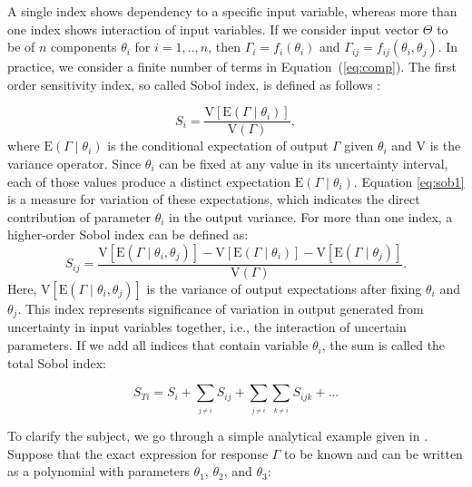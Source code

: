 A single index shows dependency to a specific input variable, whereas more than
one index shows interaction of input variables. If we consider input vector
$\Theta$ to be of $n$ components $\theta_{i}$ for $i=1,..,n$, then
$\Gamma_{i}=f_{i}(\theta_{i})$ and $\Gamma_{ij}=f_{ij}(\theta_{i},\theta_{j})$.
In practice, we consider a finite number of terms in Equation~(\ref{eq:comp}).
 The first order sensitivity index, so called Sobol index, is defined as follows
\cite{saltelli2007global}:

\begin{equation}
S_{i}=\frac{\mbox{V}[\mbox{E}(\Gamma\mid\theta_{i})]}{\mbox{V}(\Gamma)},
\label{eq:sob1}\end{equation} where $\mbox{E}(\Gamma\mid\theta_{i})$ is the
conditional
expectation of output $\Gamma$ given $\theta_{i}$ and $\mbox{V}$ is the variance
operator. Since $\theta_{i}$ can be fixed at any value in its uncertainty
interval, each of those values produce a distinct expectation
$\mbox{E}(\Gamma\mid\theta_{i})$. Equation \ref{eq:sob1} is a measure for
variation of these expectations, which indicates the direct contribution of
parameter $\theta_i$ in the output variance. For more than one index, a
higher-order Sobol index can be defined as:\begin{equation}
S_{ij}=\frac{\mbox{V}[\mbox{E}(\Gamma\mid\theta_{i},\theta_{j})]-\mbox{V}[\mbox{
E}(\Gamma\mid\theta_{i})]-\mbox{V}[\mbox{E}(\Gamma\mid\theta_{j})]}{\mbox{V}
(\Gamma)}.\label{eq:sob2}\end{equation} Here,
$\mbox{V}[\mbox{E}(\Gamma\mid\theta_{i},\theta_{j})]$ is the variance of output
expectations after fixing $\theta_{i}$ and $\theta_{j}$. This index represents
significance of variation in output generated from uncertainty in input 
variables together, i.e., the interaction of uncertain parameters. If we add all
indices that contain variable $\theta_{i}$, the sum is called the total Sobol
index:

\begin{equation}
S_{Ti}=S_{i}+\underset{_{j\neq i}}{\sum}S_{ij}+\underset{_{j\neq
i}}{\sum}\underset{_{k\neq i}}{\sum}S_{ijk}+...\label{eq:totSob}\end{equation}

To clarify the subject, we go through a simple analytical example given in
\cite{arwade2010variance}. Suppose that the exact expression for response
$\Gamma$ to be known and can be written as a polynomial with parameters
$\theta_1$, $\theta_2$, and $\theta_3$:
 
